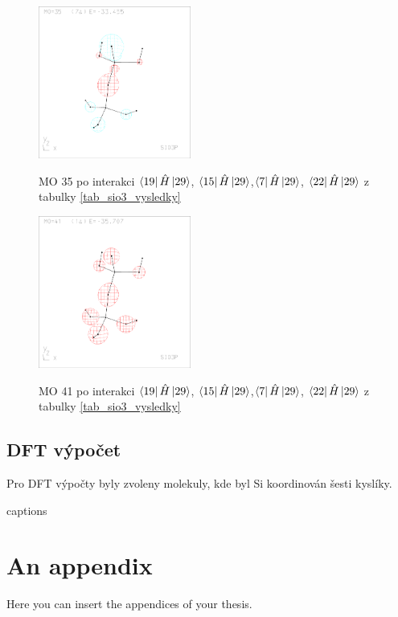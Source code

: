 \documentclass[
  digital, %
  table,   %
  lof,     %
  lot,     %
]{fithesis3}
\begin{document}
\begin{figure}[h]
\caption{MO 35 po interakci $\bra{19}{\hat{H}}\ket{29}$, $\bra{15}{\hat{H}}\ket{29}$,$\bra{7}{\hat{H}}\ket{29}$, $\bra{22}{\hat{H}}\ket{29}$ z tabulky \ref{tab_sio3_vysledky}}
  \center
  \includegraphics[width=5cm]{sio3p_obrazky/mo_35.eps}
  \label{obr_sio3_MO_35}
  \end{figure}  
  
\begin{figure}[h]
\caption{MO 41 po interakci $\bra{19}{\hat{H}}\ket{29}$, $\bra{15}{\hat{H}}\ket{29}$,$\bra{7}{\hat{H}}\ket{29}$, $\bra{22}{\hat{H}}\ket{29}$ z tabulky \ref{tab_sio3_vysledky}}
  \center
  \includegraphics[width=5cm]{sio3p_obrazky/mo_41.eps}
  \label{obr_sio3_MO_41}
  \end{figure}  
  
\section{DFT výpočet} 
Pro DFT výpočty byly zvoleny molekuly, kde byl Si koordinován šesti kyslíky. 
  
  
{\csname captions\languagename\endcsname %
\makeatletter %
  \thesis@selectLocale{\thesis@locale}\makeatother
\printbibliography[heading=bibintoc]} %
\appendix %
\chapter{An appendix}
Here you can insert the appendices of your thesis.   
\end{document}

